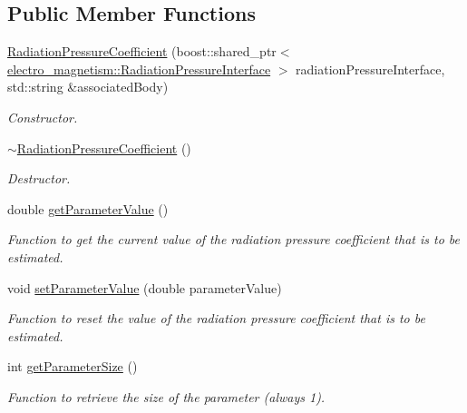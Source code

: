 \subsection*{Public Member Functions}
\begin{DoxyCompactItemize}
\item 
\hyperlink{classtudat_1_1estimatable__parameters_1_1RadiationPressureCoefficient_a55054a5fd40bd41d28440fee0fca985d}{Radiation\+Pressure\+Coefficient} (boost\+::shared\+\_\+ptr$<$ \hyperlink{classtudat_1_1electro__magnetism_1_1RadiationPressureInterface}{electro\+\_\+magnetism\+::\+Radiation\+Pressure\+Interface} $>$ radiation\+Pressure\+Interface, std\+::string \&associated\+Body)
\begin{DoxyCompactList}\small\item\em Constructor. \end{DoxyCompactList}\item 
\hyperlink{classtudat_1_1estimatable__parameters_1_1RadiationPressureCoefficient_aa5ccfd45857f8c67bf52cc1f860559a8}{$\sim$\+Radiation\+Pressure\+Coefficient} ()\hypertarget{classtudat_1_1estimatable__parameters_1_1RadiationPressureCoefficient_aa5ccfd45857f8c67bf52cc1f860559a8}{}\label{classtudat_1_1estimatable__parameters_1_1RadiationPressureCoefficient_aa5ccfd45857f8c67bf52cc1f860559a8}

\begin{DoxyCompactList}\small\item\em Destructor. \end{DoxyCompactList}\item 
double \hyperlink{classtudat_1_1estimatable__parameters_1_1RadiationPressureCoefficient_a1ff0890df59c45352030750744f9d121}{get\+Parameter\+Value} ()
\begin{DoxyCompactList}\small\item\em Function to get the current value of the radiation pressure coefficient that is to be estimated. \end{DoxyCompactList}\item 
void \hyperlink{classtudat_1_1estimatable__parameters_1_1RadiationPressureCoefficient_afa6dd3600b17a9d92c64c804e3596319}{set\+Parameter\+Value} (double parameter\+Value)
\begin{DoxyCompactList}\small\item\em Function to reset the value of the radiation pressure coefficient that is to be estimated. \end{DoxyCompactList}\item 
int \hyperlink{classtudat_1_1estimatable__parameters_1_1RadiationPressureCoefficient_ae7282eeffa763137a4d633d7dec4e10f}{get\+Parameter\+Size} ()
\begin{DoxyCompactList}\small\item\em Function to retrieve the size of the parameter (always 1). \end{DoxyCompactList}\end{DoxyCompactItemize}
